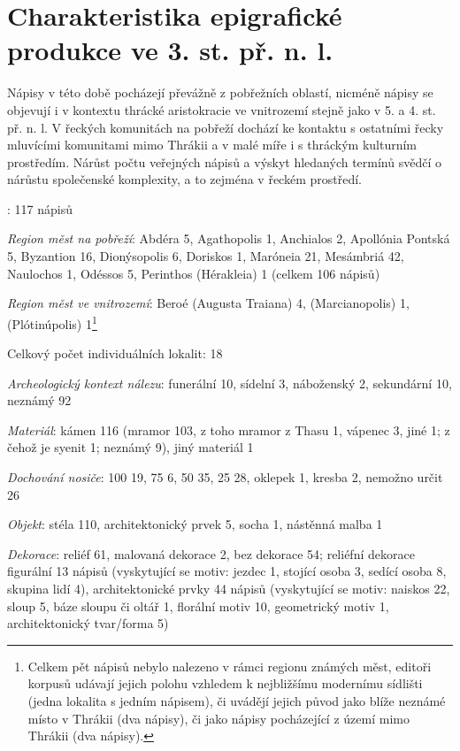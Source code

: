 \section[charakteristika-epigrafické-produkce-ve-3.-st.-př.-n.-l.]{Charakteristika epigrafické produkce ve 3. st. př. n. l.}

Nápisy v této době pocházejí převážně z pobřežních oblastí, nicméně nápisy se objevují i v kontextu thrácké aristokracie ve vnitrozemí stejně jako v 5. a 4. st. př. n. l. V řeckých komunitách na pobřeží dochází ke kontaktu s ostatními řecky mluvícími komunitami mimo Thrákii a v malé míře i s thráckým kulturním prostředím. Nárůst počtu veřejných nápisů a výskyt hledaných termínů svědčí o nárůstu společenské komplexity, a to zejména v řeckém prostředí.

\placetable[none]{}
\starttable[|l|]
\HL
{}: 117 nápisů

{\em Region měst na pobřeží}: Abdéra 5, Agathopolis 1, Anchialos 2, Apollónia Pontská 5, Byzantion 16, Dionýsopolis 6, Doriskos 1, Maróneia 21, Mesámbriá 42, Naulochos 1, Odéssos 5, Perinthos (Hérakleia) 1 (celkem 106 nápisů)

{\em Region měst ve vnitrozemí}: Beroé (Augusta Traiana) 4, (Marcianopolis) 1, (Plótinúpolis) 1\footnote{Celkem pět nápisů nebylo nalezeno v rámci regionu známých měst, editoři korpusů udávají jejich polohu vzhledem k nejbližšímu modernímu sídlišti (jedna lokalita s jedním nápisem), či uvádějí jejich původ jako blíže neznámé místo v Thrákii (dva nápisy), či jako nápisy pocházející z území mimo Thrákii (dva nápisy).}

Celkový počet individuálních lokalit: 18

{\em Archeologický kontext nálezu}: funerální 10, sídelní 3, náboženský 2, sekundární 10, neznámý 92

{\em Materiál}: kámen 116 (mramor 103, z toho mramor z Thasu 1, vápenec 3, jiné 1; z čehož je syenit 1; neznámý 9), jiný materiál 1

{\em Dochování nosiče}: 100  19, 75  6, 50  35, 25  28, oklepek 1, kresba 2, nemožno určit 26

{\em Objekt}: stéla 110, architektonický prvek 5, socha 1, nástěnná malba 1

{\em Dekorace}: reliéf 61, malovaná dekorace 2, bez dekorace 54; reliéfní dekorace figurální 13 nápisů (vyskytující se motiv: jezdec 1, stojící osoba 3, sedící osoba 8, skupina lidí 4), architektonické prvky 44 nápisů (vyskytující se motiv: naiskos 22, sloup 5, báze sloupu či oltář 1, florální motiv 10, geometrický motiv 1, architektonický tvar/forma 5)

